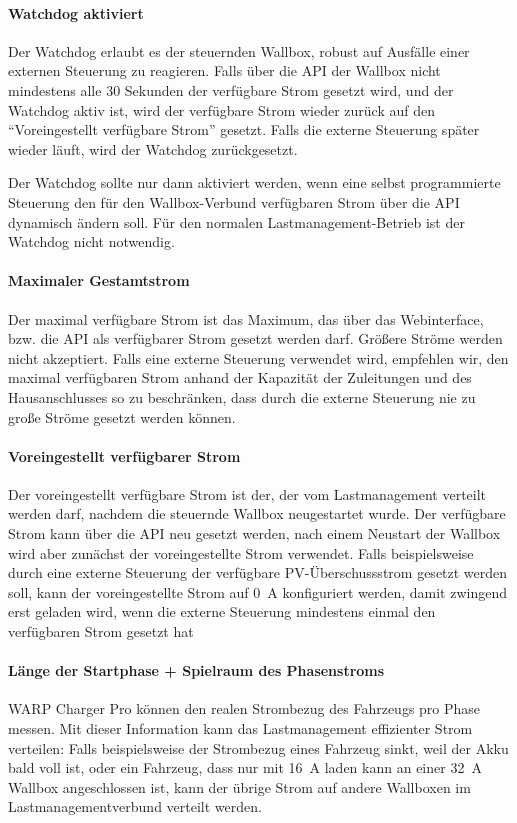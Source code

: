 \documentclass[a4paper,10pt]{article}
\newcommand{\hint}[1]{\begin{tcolorbox}[colback=boxgray,colframe=black,coltext=
white,title=Hinweis,left*=2mm,right*=2mm,boxsep=1mm,bottom=1mm,top=1mm]#1\end{tcolorbox}}
\begin{document}
\begin{multicols*}{2}
    \paragraph{Watchdog aktiviert}
    Der Watchdog erlaubt es der steuernden Wallbox, robust auf Ausfälle einer externen Steuerung zu reagieren. Falls über die API der Wallbox
    nicht mindestens alle 30 Sekunden der verfügbare Strom gesetzt wird, und der Watchdog aktiv ist, wird der verfügbare Strom wieder zurück auf den
    \enquote{Voreingestellt verfügbare Strom} gesetzt. Falls die externe Steuerung später wieder läuft, wird der Watchdog zurückgesetzt.
    \hint{Der Watchdog sollte nur dann aktiviert werden,
    wenn eine selbst programmierte Steuerung den für den Wallbox-Verbund verfügbaren Strom über die API dynamisch ändern soll.
    Für den normalen Lastmanagement-Betrieb ist der Watchdog nicht notwendig.}

    \paragraph{Maximaler Gestamtstrom}
    Der maximal verfügbare Strom ist das Maximum, das über das Webinterface, bzw. die API als verfügbarer Strom gesetzt werden darf.
    Größere Ströme werden nicht akzeptiert. Falls eine externe Steuerung verwendet wird, empfehlen wir, den maximal verfügbaren Strom
    anhand der Kapazität der Zuleitungen und des Hausanschlusses so zu beschränken, dass durch die externe Steuerung nie zu große
    Ströme gesetzt werden können.

    \paragraph{Voreingestellt verfügbarer Strom}
    Der voreingestellt verfügbare Strom ist der, der vom Lastmanagement verteilt werden darf, nachdem die steuernde Wallbox
    neugestartet wurde. Der verfügbare Strom kann über die API neu gesetzt werden, nach einem Neustart der Wallbox wird aber
    zunächst der voreingestellte Strom verwendet. Falls beispielsweise durch eine externe Steuerung der verfügbare PV-Überschussstrom
    gesetzt werden soll, kann der voreingestellte Strom auf \SI{0}{\ampere} konfiguriert werden, damit zwingend erst geladen wird,
    wenn die externe Steuerung mindestens einmal den verfügbaren Strom gesetzt hat

    \paragraph{Länge der Startphase + Spielraum des Phasenstroms}
    WARP Charger Pro können den realen Strombezug des Fahrzeugs pro Phase messen.
    Mit dieser Information kann das Lastmanagement effizienter Strom verteilen: Falls beispielsweise
    der Strombezug eines Fahrzeug sinkt, weil der Akku bald voll ist, oder ein Fahrzeug, dass nur mit \SI{16}{\ampere}
    laden kann an einer \SI{32}{\ampere} Wallbox angeschlossen ist, kann der übrige Strom auf andere Wallboxen
    im Lastmanagementverbund verteilt werden.


\end{multicols*}
\end{document}

